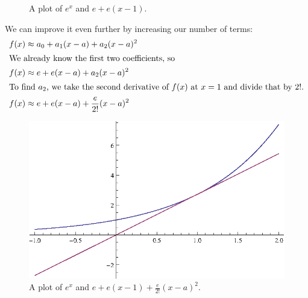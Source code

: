 \begin{ex}
\begin{figure}[H]
\begin{center}
    \end{center}
    \caption{A plot of $e^x$ and $e+e(x-1)$.}
  \end{figure}
  We can improve it even further by increasing our number of terms:
  \begin{align*}
    f(x) &\approx a_0 + a_1 (x-a) + a_2 (x-a)^2 \\
    \intertext{We already know the first two coefficients, so}
    f(x) &\approx e + e (x-a) + a_2 (x-a)^2 \\
    \intertext{To find $a_2$, we take the second derivative of $f(x)$ at $x=1$ and divide that by $2!$.}
    f(x) &\approx e + e (x-a) + \frac{e}{2!} (x-a)^2 \\
  \end{align*}
  \begin{figure}[H]
    \begin{center}
      \includegraphics{continuous/series/1storder.eps}
    \end{center}
    \caption{A plot of $e^x$ and $e+e(x-1)+\frac{e}{2!} (x-a)^2$.}
  \end{figure}
\end{ex}
